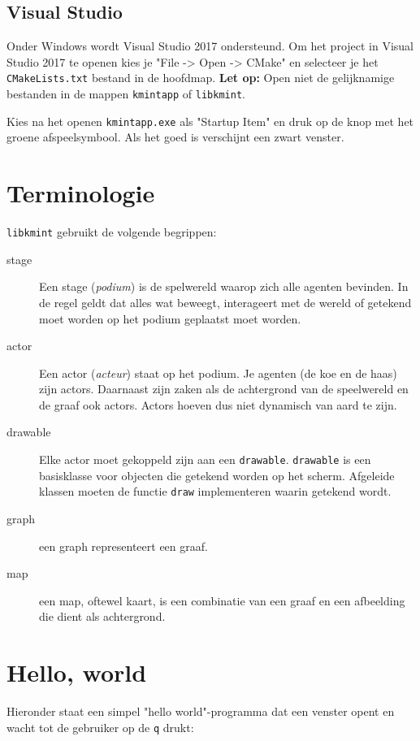 \documentclass[11pt]{article}
\begin{document}
\subsection{Visual Studio}
\label{sec:orgaaac59a}
Onder Windows wordt Visual Studio 2017 ondersteund. Om het
project in Visual Studio 2017 te openen kies je "File -> Open -> CMake" en
selecteer je het \texttt{CMakeLists.txt} bestand in de hoofdmap. \textbf{Let op:} Open niet
de gelijknamige bestanden in de mappen \texttt{kmintapp} of \texttt{libkmint}. 

Kies na het openen \texttt{kmintapp.exe} als "Startup Item" en druk op de knop met
het groene afspeelsymbool. Als het goed is verschijnt een zwart venster.




\section{Terminologie}
\label{sec:org34a10d8}
\texttt{libkmint} gebruikt de volgende begrippen:
\begin{description}
\item[{stage}] Een stage (\emph{podium}) is de spelwereld waarop zich alle agenten
bevinden. In de regel geldt dat alles wat beweegt, interageert
met de wereld of getekend moet worden op het podium geplaatst
moet worden.
\item[{actor}] Een actor (\emph{acteur}) staat op het podium. Je agenten (de koe en
de haas) zijn actors. Daarnaast zijn zaken als de achtergrond van
de speelwereld en de graaf ook actors. Actors hoeven dus niet
dynamisch van aard te zijn.
\item[{drawable}] Elke actor moet gekoppeld zijn aan een \texttt{drawable}. \texttt{drawable}
is een basisklasse voor objecten die getekend worden op het
scherm. Afgeleide klassen moeten de functie \texttt{draw}
implementeren waarin getekend wordt.
\item[{graph}] een graph representeert een graaf.
\item[{map}] een map, oftewel kaart, is een combinatie van een graaf en een
afbeelding die dient als achtergrond.
\end{description}



\section{Hello, world}
\label{sec:org5ae16de}
Hieronder staat een simpel "hello world"-programma dat een venster opent en
wacht tot de gebruiker op de \texttt{q} drukt:
\end{document}
